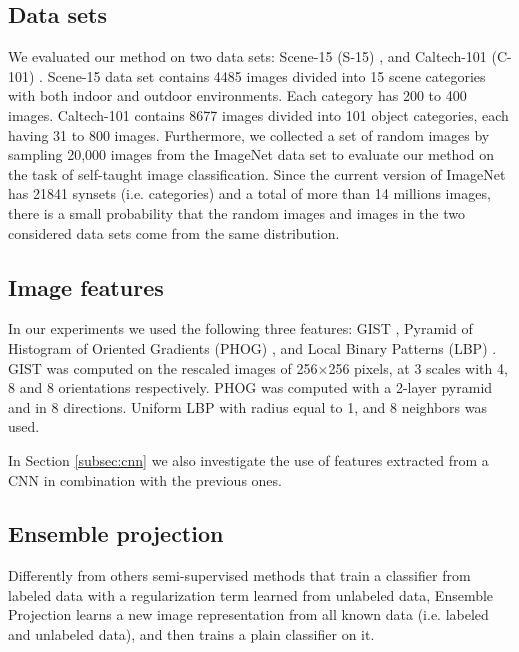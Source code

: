 \documentclass[journal,11pt]{IEEEtran}
\begin{document}
\subsection{Data sets}
We evaluated our method on two data sets: Scene-15 (S-15) \cite{lazebnik2006beyond}, and Caltech-101 (C-101) \cite{fei2007learning}. 
Scene-15 data set contains 4485 images divided into 15 scene categories with both indoor and outdoor environments. Each category has 200 to 400 images. 
Caltech-101 contains 8677 images divided into 101 object categories, each having 31 to 800 images. 
Furthermore, we collected a set of random images by sampling 20,000 images from the ImageNet data set \cite{deng2009imagenet} to evaluate our method on the task of self-taught image classification. 
Since the current version of ImageNet has 21841 synsets (i.e. categories) and a total of more than 14 millions images, there is a small probability that the random images and images in the two considered data sets  come from the same distribution. 

\subsection{Image features}
In our experiments we used the following three features: GIST \cite{oliva2001modeling}, Pyramid of Histogram of Oriented Gradients (PHOG) \cite{bosch2007image}, and Local Binary Patterns (LBP) \cite{ojala2002multiresolution}. 
GIST was computed on the rescaled images of 256$\times$256 pixels, at 3 scales with 4, 8 and 8 orientations respectively. 
PHOG was computed with a 2-layer pyramid and in 8 directions. 
Uniform LBP with radius equal to 1, and 8 neighbors was used.

In Section \ref{subsec:cnn} we also investigate the use of features extracted from a CNN \cite{razavian2014cnn} in combination with the previous ones. 

\subsection{Ensemble projection}
\label{sec:EP}
Differently from others semi-supervised methods that train a classifier 
from labeled data with a regularization term learned from unlabeled data, Ensemble Projection \cite{dai2013ensemble} learns a new image representation from all known data (i.e. labeled and unlabeled data), and then trains a plain classifier 
on it.
\end{document}
